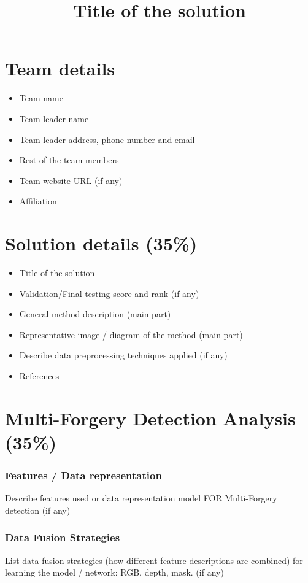 \documentclass{article}
\title{Title of the solution}
\begin{document}
\maketitle


\section{Team details}

\begin{itemize}
\item Team name
\item Team leader name
\item Team leader address, phone number and email
\item Rest of the team members
\item Team website URL (if any)
\item Affiliation
\end{itemize}


\section{Solution details (35\%)}

\begin{itemize}
\item Title of the solution
\item Validation/Final testing score and rank (if any)
\item General method description (main part)
\item Representative image / diagram of the method (main part)
\item Describe data preprocessing techniques applied (if any)
\item References
\end{itemize}


\section{Multi-Forgery Detection Analysis (35\%)}

\subsubsection{Features / Data representation}
Describe features used or data representation model FOR Multi-Forgery detection (if any)

\subsubsection{Data Fusion Strategies}
List data fusion strategies (how different feature descriptions are combined) for learning the model / network: RGB, depth, mask. (if any)
\end{document}
